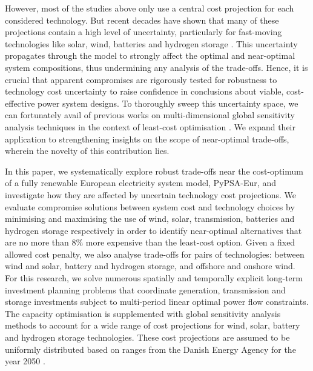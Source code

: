 However, most of the studies above only use a central cost projection for each
considered technology. But recent decades have shown that many of these
projections contain a high level of uncertainty, particularly for fast-moving
technologies like solar, wind, batteries and hydrogen storage
\cite{ludererImpactDeclining2021,victoriaSolarPhotovoltaics2021,jaxa-rozenSourcesUncertainty2021}. This
uncertainty propagates through the model to strongly affect the optimal and
near-optimal system compositions, thus undermining any analysis of the
trade-offs. Hence, it is crucial that apparent compromises are rigorously tested
for robustness to technology cost uncertainty to raise confidence in conclusions
about viable, cost-effective power system designs. To thoroughly sweep this
uncertainty space, we can fortunately avail of previous works on
multi-dimensional global sensitivity analysis techniques in the context of
least-cost optimisation \cite{trondle_trade-offs_2020,
mavromatidis_uncertainty_2018, pizarro-alonso_uncertainties_2019,
fais_impact_2016, usher_value_2015}. We expand their application to
strengthening insights on the scope of near-optimal trade-offs, wherein the
novelty of this contribution lies.


In this paper, we systematically explore robust trade-offs near the cost-optimum
of a fully renewable European electricity system model, PyPSA-Eur, and
investigate how they are affected by uncertain technology cost projections. We
evaluate compromise solutions between system cost and technology choices by
minimising and maximising the use of wind, solar, transmission, batteries and
hydrogen storage respectively in order to identify near-optimal alternatives
that are no more than 8\% more expensive than the least-cost option. Given a
fixed allowed cost penalty, we also analyse trade-offs for pairs of
technologies: between wind and solar, battery and hydrogen storage, and offshore
and onshore wind. For this research, we solve numerous spatially and temporally
explicit long-term investment planning problems that coordinate generation,
transmission and storage investments subject to multi-period linear optimal
power flow constraints. The capacity optimisation is supplemented with global
sensitivity analysis methods to account for a wide range of cost projections for
wind, solar, battery and hydrogen storage technologies. These cost projections
are assumed to be uniformly distributed based on ranges from the Danish Energy
Agency for the year 2050 \cite{DEA}.


